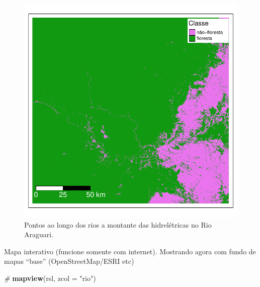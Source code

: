 \documentclass[
]{article}
\newenvironment{Shaded}{\begin{snugshade}}{\end{snugshade}}
\newcommand{\AttributeTok}[1]{\textcolor[rgb]{0.13,0.29,0.53}{#1}}
\newcommand{\CommentTok}[1]{\textcolor[rgb]{0.56,0.35,0.01}{\textit{#1}}}
\newcommand{\FunctionTok}[1]{\textcolor[rgb]{0.13,0.29,0.53}{\textbf{#1}}}
\newcommand{\NormalTok}[1]{#1}
\newcommand{\StringTok}[1]{\textcolor[rgb]{0.31,0.60,0.02}{#1}}
\begin{document}
\begin{figure}
\centering
\includegraphics{epr_files/figure-latex/unnamed-chunk-257-1.pdf}
\caption{\label{fig:unnamed-chunk-257}Pontos ao longo dos rios a montante das hidrelétricas no Rio Araguari.}
\end{figure}

Mapa interativo (funcione somente com internet). Mostrando agora com fundo de mapas ``base'' (OpenStreetMap/ESRI etc)

\begin{Shaded}
\begin{Highlighting}[]
\CommentTok{\#}
\FunctionTok{mapview}\NormalTok{(rsl, }\AttributeTok{zcol =} \StringTok{"rio"}\NormalTok{) }
\end{Highlighting}
\end{Shaded}
\end{document}
